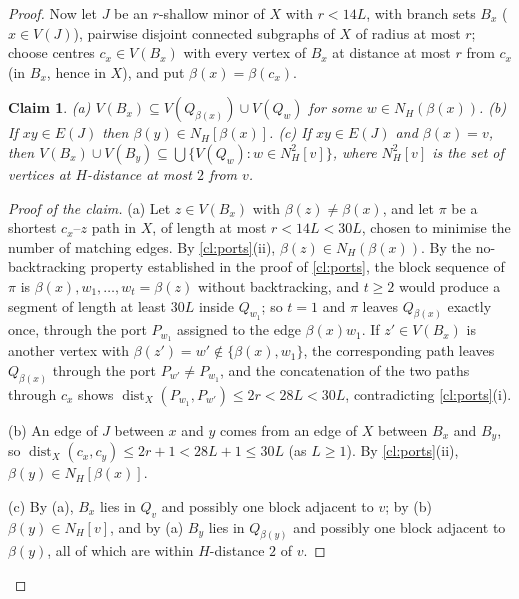 \documentclass[11pt,a4paper]{article}
\theoremstyle{plain}
\newtheorem{claim}[theorem]{Claim}
\theoremstyle{definition}
\theoremstyle{remark}
\newcommand{\dist}{\operatorname{dist}}
\begin{document}
\begin{proof}
Now let $J$ be an $r$-shallow minor of $X$ with $r<14L$, with branch sets $B_x$ ($x\in V(J)$), pairwise disjoint connected subgraphs of $X$ of radius at most $r$; choose centres $c_x\in V(B_x)$ with every vertex of $B_x$ at distance at most $r$ from $c_x$ (in $B_x$, hence in $X$), and put $\beta(x)=\beta(c_x)$.

\begin{claim}\label{cl:local}
(a) $V(B_x)\subseteq V(Q_{\beta(x)})\cup V(Q_{w})$ for some $w\in N_H(\beta(x))$.
(b) If $xy\in E(J)$ then $\beta(y)\in N_H[\beta(x)]$.
(c) If $xy\in E(J)$ and $\beta(x)=v$, then $V(B_x)\cup V(B_y)\subseteq\bigcup\{V(Q_w): w\in N^2_H[v]\}$, where $N^2_H[v]$ is the set of vertices at $H$-distance at most $2$ from $v$.
\end{claim}
\begin{proof}[Proof of the claim]
(a) Let $z\in V(B_x)$ with $\beta(z)\ne\beta(x)$, and let $\pi$ be a shortest $c_x$--$z$ path in $X$, of length at most $r<14L<30L$, chosen to minimise the number of matching edges. By \cref{cl:ports}(ii), $\beta(z)\in N_H(\beta(x))$. By the no-backtracking property established in the proof of \cref{cl:ports}, the block sequence of $\pi$ is $\beta(x),w_1,\dots,w_t=\beta(z)$ without backtracking, and $t\ge2$ would produce a segment of length at least $30L$ inside $Q_{w_1}$; so $t=1$ and $\pi$ leaves $Q_{\beta(x)}$ exactly once, through the port $P_{w_1}$ assigned to the edge $\beta(x)w_1$. If $z'\in V(B_x)$ is another vertex with $\beta(z')=w'\notin\{\beta(x),w_1\}$, the corresponding path leaves $Q_{\beta(x)}$ through the port $P_{w'}\ne P_{w_1}$, and the concatenation of the two paths through $c_x$ shows $\dist_X(P_{w_1},P_{w'})\le2r<28L<30L$, contradicting \cref{cl:ports}(i).

(b) An edge of $J$ between $x$ and $y$ comes from an edge of $X$ between $B_x$ and $B_y$, so $\dist_X(c_x,c_y)\le2r+1<28L+1\le30L$ (as $L\ge1$). By \cref{cl:ports}(ii), $\beta(y)\in N_H[\beta(x)]$.

(c) By (a), $B_x$ lies in $Q_v$ and possibly one block adjacent to $v$; by (b) $\beta(y)\in N_H[v]$, and by (a) $B_y$ lies in $Q_{\beta(y)}$ and possibly one block adjacent to $\beta(y)$, all of which are within $H$-distance $2$ of $v$.
\end{proof}


\end{proof}
\end{document}
